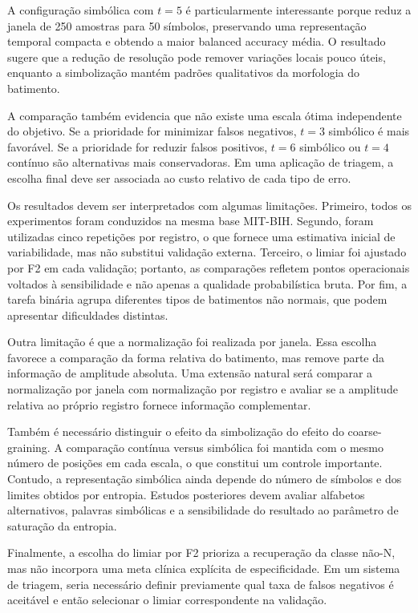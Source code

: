 \documentclass[12pt,a4paper]{article}
\begin{document}
A configuração simbólica com $t=5$ é particularmente interessante porque reduz a janela de 250 amostras para 50 símbolos, preservando uma representação temporal compacta e obtendo a maior balanced accuracy média. O resultado sugere que a redução de resolução pode remover variações locais pouco úteis, enquanto a simbolização mantém padrões qualitativos da morfologia do batimento.

A comparação também evidencia que não existe uma escala ótima independente do objetivo. Se a prioridade for minimizar falsos negativos, $t=3$ simbólico é mais favorável. Se a prioridade for reduzir falsos positivos, $t=6$ simbólico ou $t=4$ contínuo são alternativas mais conservadoras. Em uma aplicação de triagem, a escolha final deve ser associada ao custo relativo de cada tipo de erro.

Os resultados devem ser interpretados com algumas limitações. Primeiro, todos os experimentos foram conduzidos na mesma base MIT-BIH. Segundo, foram utilizadas cinco repetições por registro, o que fornece uma estimativa inicial de variabilidade, mas não substitui validação externa. Terceiro, o limiar foi ajustado por F2 em cada validação; portanto, as comparações refletem pontos operacionais voltados à sensibilidade e não apenas a qualidade probabilística bruta. Por fim, a tarefa binária agrupa diferentes tipos de batimentos não normais, que podem apresentar dificuldades distintas.

Outra limitação é que a normalização foi realizada por janela. Essa escolha favorece a comparação da forma relativa do batimento, mas remove parte da informação de amplitude absoluta. Uma extensão natural será comparar a normalização por janela com normalização por registro e avaliar se a amplitude relativa ao próprio registro fornece informação complementar.

Também é necessário distinguir o efeito da simbolização do efeito do coarse-graining. A comparação contínua versus simbólica foi mantida com o mesmo número de posições em cada escala, o que constitui um controle importante. Contudo, a representação simbólica ainda depende do número de símbolos e dos limites obtidos por entropia. Estudos posteriores devem avaliar alfabetos alternativos, palavras simbólicas e a sensibilidade do resultado ao parâmetro de saturação da entropia.

Finalmente, a escolha do limiar por F2 prioriza a recuperação da classe não-N, mas não incorpora uma meta clínica explícita de especificidade. Em um sistema de triagem, seria necessário definir previamente qual taxa de falsos negativos é aceitável e então selecionar o limiar correspondente na validação.
\end{document}
